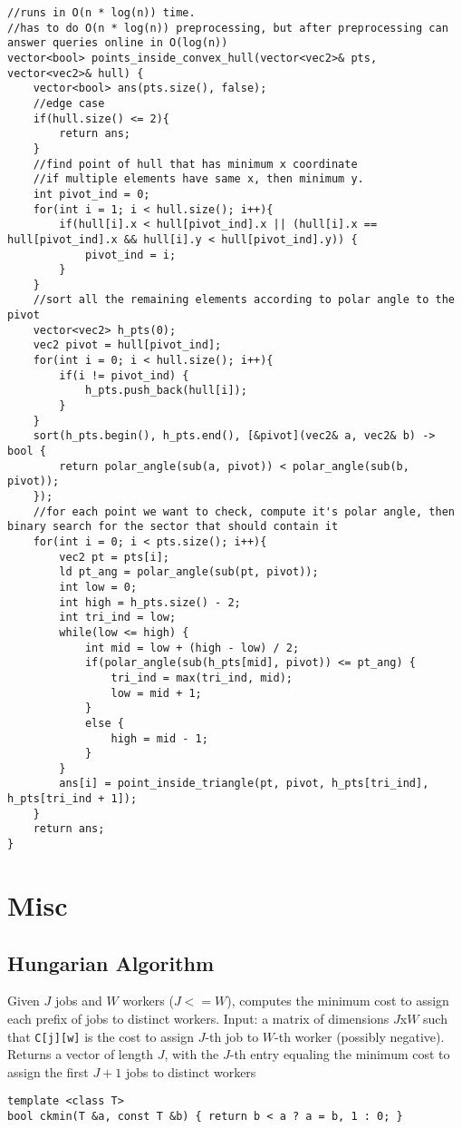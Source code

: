 \documentclass[8pt, headheight=10pt]{scrartcl}
\begin{document}
\begin{multicols*}{3}
\begin{lstlisting}
//runs in O(n * log(n)) time. 
//has to do O(n * log(n)) preprocessing, but after preprocessing can answer queries online in O(log(n))
vector<bool> points_inside_convex_hull(vector<vec2>& pts, vector<vec2>& hull) {
    vector<bool> ans(pts.size(), false);
    //edge case
    if(hull.size() <= 2){
        return ans;
    }
    //find point of hull that has minimum x coordinate
    //if multiple elements have same x, then minimum y. 
    int pivot_ind = 0;
    for(int i = 1; i < hull.size(); i++){
        if(hull[i].x < hull[pivot_ind].x || (hull[i].x == hull[pivot_ind].x && hull[i].y < hull[pivot_ind].y)) {
            pivot_ind = i;
        }
    }
    //sort all the remaining elements according to polar angle to the pivot
    vector<vec2> h_pts(0);
    vec2 pivot = hull[pivot_ind];
    for(int i = 0; i < hull.size(); i++){
        if(i != pivot_ind) {
            h_pts.push_back(hull[i]);
        }
    }
    sort(h_pts.begin(), h_pts.end(), [&pivot](vec2& a, vec2& b) -> bool {
        return polar_angle(sub(a, pivot)) < polar_angle(sub(b, pivot));
    });
    //for each point we want to check, compute it's polar angle, then binary search for the sector that should contain it
    for(int i = 0; i < pts.size(); i++){
        vec2 pt = pts[i];
        ld pt_ang = polar_angle(sub(pt, pivot));
        int low = 0;
        int high = h_pts.size() - 2;
        int tri_ind = low;
        while(low <= high) {
            int mid = low + (high - low) / 2;
            if(polar_angle(sub(h_pts[mid], pivot)) <= pt_ang) {
                tri_ind = max(tri_ind, mid);
                low = mid + 1;
            }
            else {
                high = mid - 1;
            }
        }
        ans[i] = point_inside_triangle(pt, pivot, h_pts[tri_ind], h_pts[tri_ind + 1]);
    }
    return ans;
}

\end{lstlisting}

\section{Misc}
\subsection{Hungarian Algorithm}
Given $J$ jobs and $W$ workers ($J <= W$), computes the minimum cost to assign each prefix of jobs to distinct workers. Input: a matrix of dimensions $J$x$W$ such that \lstinline{C[j][w]} is the cost to assign $J$-th job to $W$-th worker (possibly negative). Returns a vector of length $J$, with the $J$-th entry equaling the minimum cost to assign the first $J+1$ jobs to distinct workers
\begin{lstlisting}
template <class T> 
bool ckmin(T &a, const T &b) { return b < a ? a = b, 1 : 0; }


\end{lstlisting}
\end{multicols*}
\end{document}
